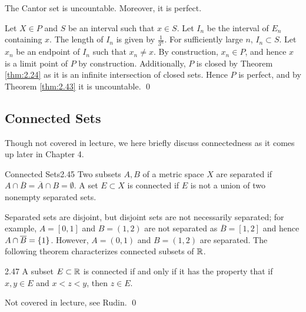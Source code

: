 \begin{ntheorem}{}{}
    The Cantor set is uncountable. Moreover, it is perfect.
\end{ntheorem}


\begin{nproof}
    Let $X \in P$ and $S$ be an interval such that $x \in S$. Let $I_n$ be the interval of $E_n$ containing $x$. The length of $I_n$ is given by $\frac{1}{3^n}$. For sufficiently large $n$, $I_n \subset S$. Let $x_n$ be an endpoint of $I_n$ such that $x_n \neq x$. By construction, $x_n \in P$, and hence $x$ is a limit point of $P$ by construction. Additionally, $P$ is closed by Theorem \ref{thm:2.24} as it is an infinite intersection of closed sets. Hence $P$ is perfect, and by Theorem \ref{thm:2.43} it is uncountable. \qed
\end{nproof}

\subsection{Connected Sets}
Though not covered in lecture, we here briefly discuss connectedness as it comes up later in Chapter 4.

\begin{definition}{Connected Sets}{2.45}
    Two subsets $A, B$ of a metric space $X$ are separated if $A \cap \overline{B} = \overline{A} \cap B = \emptyset$. A set $E \subset X$ is connected if $E$ is not a union of two nonempty separated sets.
\end{definition}
\noindent Separated sets are disjoint, but disjoint sets are not necessarily separated; for example, $A = [0, 1]$ and $B = (1, 2)$ are not separated as $\overline{B} = [1, 2]$ and hence $A \cap \overline{B} = \set{1}$. However, $A = (0, 1)$ and $B = (1, 2)$ are separated. The following theorem characterizes connected subsets of $\mathbb{R}$. 
\setcounter{rudin}{46}
\begin{theorem}{}{2.47}
    A subset $E \subset \mathbb{R}$ is connected if and only if it has the property that if $x, y \in E$ and $x < z < y$, then $z \in E$.
\end{theorem}
\begin{nproof}
    Not covered in lecture, see Rudin. \qed
\end{nproof}
